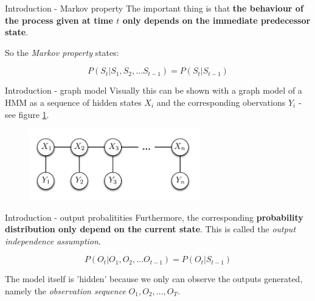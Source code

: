 \documentclass[11pt]{beamer}
\begin{document}
\begin{frame}{Introduction - Markov property}
The important thing is that \textbf{the behaviour of the process given at time $t$ only depends on the immediate predecessor state}.

So the \emph{Markov property} states:

\begin{equation}
	P(S_t | S_1,S_2, \ldots S_{t-1}) = P(S_t | S_{t-1})
\end{equation}
\end{frame}

\begin{frame}{Introduction - graph model}
Visually this can be shown with a graph model of a HMM as a sequence of hidden states $X_i$ and the corresponding obervations $Y_i$ - see figure \ref{fig:GraphModel}.

\begin{figure}[H]
	\centering
	
	\includegraphics[width=0.66\textwidth]{./Images/GraphModelHMM_1.png}
	\caption{ }
	\label{fig:GraphModel}
\end{figure}

\end{frame}

\begin{frame}{Introduction - output probalitities}
Furthermore, the corresponding \textbf{probability distribution only depend on the current state}. This is called the \emph{output independence assumption}.

\begin{equation}
P(O_t | O_1,O_2, \ldots O_{t-1}) = P(O_t | S_{t-1})
\end{equation}

The model itself is 'hidden' because we only can observe the outputs generated, namely the \emph{observation sequence} $O_1, O_2, \ldots,  O_T$.
\end{frame}
\end{document}
